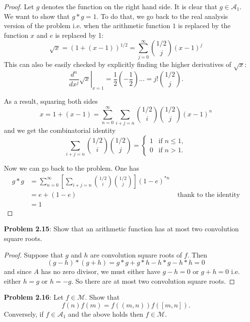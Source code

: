 \documentclass{article}
\newcommand{\A}{\mathcal{A}}
\newcommand{\M}{\mathcal{M}}
\begin{document}
\begin{proof}
Let $g$ denotes the function on the right hand side. It is clear that $g \in \A_1$. We want to show that $g * g = 1$. To do that, we go back to the real analysis version of the problem i.e. when the arithmetic function $1$ is replaced by the function $x$ and $e$ is replaced by 1:
$$\sqrt{x} = (1 + (x - 1))^{1/2} = \sum_{j = 0}^{\infty} \binom{1/2}{j} (x - 1)^j$$
This can also be easily checked by explicitly finding the higher derivatives of $\sqrt{x}$:
$$\left. \frac{d^n}{dx^j} \sqrt{x} \right|_{x = 1} = \frac{1}{2} \left(-\frac{1}{2}\right) ... = j! \binom{1/2}{j}.$$

As a result, squaring both sides
$$x = 1 + (x - 1) = \sum_{n = 0}^{\infty} \sum_{i + j = n} \binom{1/2}{i} \binom{1/2}{j} (x - 1)^n$$
and we get the combinatorial identity
$$\sum_{i + j = n} \binom{1/2}{i} \binom{1/2}{j} = \begin{cases}1 &\text{if } n \leq 1, \\ 0 &\text{if } n > 1.\end{cases}$$

Now we can go back to the problem. One has
\begin{align*}
g * g &= \sum_{n = 0}^{\infty} \left[\sum_{i + j = n} \binom{1/2}{i} \binom{1/2}{j} \right] (1 - e)^{*n}\\
&= e + (1 - e) &\text{ thank to the identity}\\
&= 1
\end{align*}
\end{proof}

\textbf{Problem 2.15}: Show that an arithmetic function has at most two convolution square roots.

\begin{proof}
Suppose that $g$ and $h$ are convolution square roots of $f$. Then
$$(g - h) * (g + h) = g * g + g * h - h * g - h * h = 0$$
and since $A$ has no zero divisor, we must either have $g - h = 0$ or $g + h = 0$ i.e. either $h = g$ or $h = -g$. So there are at most two convolution square roots.
\end{proof}

\textbf{Problem 2.16}: Let $f \in \M$. Show that
$$f(n) f(m) = f((m, n)) f([m, n]).$$
Conversely, if $f \in \A_1$ and the above holds then $f \in \M$.
\end{document}

